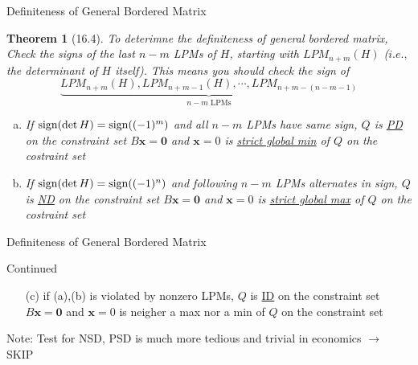 \documentclass[a4paper,11pt]{article}
\newtheorem{thm}{Theorem}
\newcommand{\bd}{\mathbf}
\begin{document}
\begin{frame}[t]{Definiteness of General Bordered Matrix}
	\begin{thm}
		[16.4] To deterimne the definiteness of general bordered matrix, Check the signs of the last $n-m$ LPMs of $H$, starting with $LPM_{n+m}(H)$ ($i.e.,$ the determinant of $H$ itself). This means you should check the sign of \[
			\underbrace{LPM_{n+m}(H), LPM_{n+m-1}(H), \cdots,LPM_{n+m-(n-m-1)}}_{n-m\text{ LPMs}}
		\]
		\begin{enumerate}[(a)]
			\item If ${\rm sign}(\det H)={\rm sign}((-1)^m)$ and all $n-m$ LPMs have same sign, $Q$ is \uline{PD} on the constraint set $B\bd{x}=\bd{0}$ and $\bd{x}=0$ is \uline{strict global min} of $Q$ on the costraint set
			\item If ${\rm sign}(\det H)={\rm sign}((-1)^n)$ and following $n-m$ LPMs alternates in sign, $Q$ is \uline{ND} on the constraint set $B\bd{x}=\bd{0}$ and $\bd{x}=0$ is \uline{strict global max} of $Q$ on the costraint set
		\end{enumerate}
	\end{thm}
\end{frame}

\begin{frame}[t]{Definiteness of General Bordered Matrix}
	\begin{block}
		{Continued}
		\begin{enumerate}[(a)]
			\item [(c)] if (a),(b) is violated by nonzero LPMs, $Q$ is \uline{ID} on the constraint set $B\bd{x}=\bd{0}$ and $\bd{x}=0$ is neigher a max nor a min of $Q$ on the constraint set
		\end{enumerate}
	\end{block}
	Note: Test for NSD, PSD is much more tedious and trivial in economics $\rightarrow$ SKIP
\end{frame}
\end{document}
